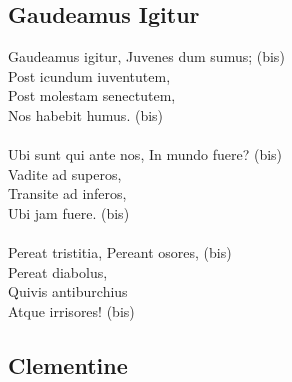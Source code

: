 \documentclass[a5paper]{article}
\begin{document}
\newpage

\subsection{Gaudeamus Igitur} %
\label{sub:gaudeamus_igitur}

Gaudeamus igitur, Juvenes dum sumus; (bis)\\
Post icundum iuventutem,\\
Post molestam senectutem,\\
Nos habebit humus. (bis)	 \\
\\
Ubi sunt qui ante nos, In mundo fuere? (bis)\\
Vadite ad superos,\\
Transite ad inferos,\\
Ubi jam fuere. (bis)	 \\
\\
Pereat tristitia, Pereant osores, (bis)\\
Pereat diabolus,\\
Quivis antiburchius\\
Atque irrisores!	 (bis)\\

\newpage

\subsection{Clementine} %
\label{sub:clementine}
\end{document}
